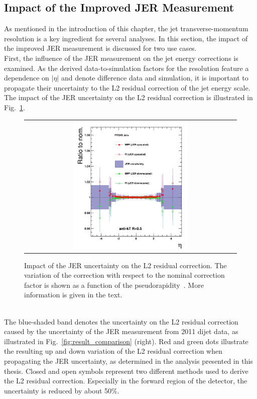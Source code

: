 \subsection{Impact of the Improved JER Measurement}
\label{subsec:jer_results_impact}
As mentioned in the introduction of this chapter, the jet transverse-momentum resolution is a key ingredient for several analyses. In this section, the impact of the improved JER measurement is discussed for two use cases. \\
First, the influence of the JER measurement on the jet energy corrections is examined. As the derived data-to-simulation factors for the resolution feature a dependence on $|\eta|$ and denote difference data and simulation, it is important to propagate their uncertainty to the L2 residual correction of the jet energy scale. The impact of the JER uncertainty on the L2 residual correction is illustrated in Fig.~\ref{fig:result_jec_impact}.  
\begin{figure}[!t]
  \centering
  \begin{tabular}{c}
                \includegraphics[width=0.55\textwidth]{figures/newJER_L2V4_L3fixed-ratio_mod.jpg} 
  \end{tabular}
  \caption{Impact of the JER uncertainty on the L2 residual correction. The variation of the correction with respect to the nominal correction factor is shown as a function of the pseudorapidity~\cite{DRathjens}. More information is given in the text.}
  \label{fig:result_jec_impact}
\end{figure}
\\
The blue-shaded band denotes the uncertainty on the L2 residual correction caused by the uncertainty of the JER measurement from 2011 dijet data, as illustrated in Fig.~\ref{fig:result_comparison} (right). Red and green dots illustrate the resulting up and down variation of the L2 residual correction when propagating the JER uncertainty, as determined in the analysis presented in this thesis. Closed and open symbols represent two different methods used to derive the L2 residual correction. Especially in the forward region of the detector, the uncertainty is reduced by about 50\%. \\
